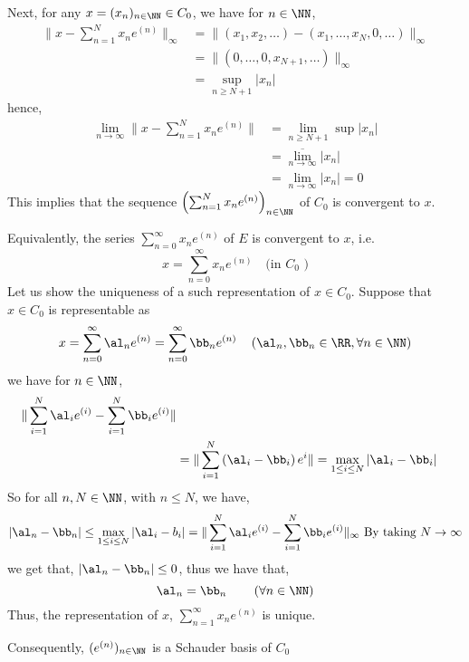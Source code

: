 \begin{example}
Next, for any $x = (x_{n}) _{n \in \NN}  \in  C_0$, 
we have for $n \in \NN $,
\begin{align*}
	\| x - \sum_{n=1}^{N}  x_{n}e^{(n) } \| _{\infty } &=
	\| (x_1, x_2, \hdots ) - 
	(x_1, \hdots , x_{N}, 0, \hdots ) \|_{\infty }    \\
	&=  \| (0, \hdots , 0, x_{N+1}, \hdots )  \| _{\infty } \\
	&= \sup_{n \geq N+1} \left| x_{n} \right|    
\end{align*}
hence,
\begin{align*}
	\lim_{n \to \infty } 
	\| x - \sum_{n=1}^{N} x_{n}e^{(n) } \|  &= \lim_{n  \geq N+1}  
\sup_{}  \left| x_{n} \right| \\
						&=
						\overline{
						\lim_{n \to \infty} } 
						\left| x_{n} \right| \\ &= \lim_{n \to \infty } 
	\left| x_{n} \right| = 0
\end{align*}
This implies that the sequence 
$\left( \sum_{n=1}^{N} x_{n}e^{(n) } \right)_{n \in \NN} $   
of $C_0 $  is convergent to $x$. 

Equivalently, the series $\sum_{n=0}^{\infty}  x_{n}e^{(n) } $  
of $E $ is convergent to $x $, i.e. 
\[
x = \sum_{n=0}^{\infty}  
x_{n}e^{(n) } \quad \text{(in $C_0 $ )} 
\]
Let us show the uniqueness of a such representation of 
$x \in  C_0 $. Suppose that $x \in  C_0 $  is representable
as 
\[
x = \sum_{n=0}^{\infty}  \al_{n} e^{(n) } = 
\sum_{n=0}^{\infty}  \bb_{n} e^{(n) } \quad 
\left( \al_{n}, \bb _n \in  \RR, \forall n \in  \NN\right)
\]
we have for $n \in \NN $, 
\begin{align*}
\| \sum_{i=1}^{N} \al_{i} e^{(i) } - \sum_{i=1}^{N} \bb_{i} e^{(i) }\|   \\
&= \| \sum_{i=1}^{N} \left( \al_{i} - \bb_{i} \right)e^{i} \|  = 
\max_{ 1 \leq i \leq N} 
\left| \al_{i} - \bb_{i} \right|
\end{align*}                     
So for all $n, N \in \NN $, with $n \leq N $, we have, 
\[
\left| \al_{n} - \bb_{n} \right| \leq 
\max _{1 \leq i \leq N} 
\left| \al_{i} - b_{i} \right| =
\| \sum_{i=1}^{N} \al_{i} e^{(i)} - \sum_{i=1}^{N} \bb_{i} e^{(i) } \|  _{\infty }
\text{ By taking } N \rightarrow \infty 
\]
we get that, 
$\left| \al_{n} - \bb_{n} \right|  \leq  0 $, 
thus we have that,
\[
	\al_{n} = \bb_{n} \quad \quad \left( \forall n \in \NN \right)
\]
Thus, the representation of $x$, 
$\sum_{n=1}^{\infty } x_{n} e^{(n) } $ is unique. 

Consequently, $(e^{(n) })_{n \in \NN}  $  is a Schauder basis
of $C_0$ 
\end{example}
\divider
